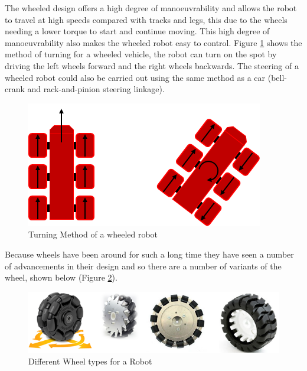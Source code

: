 The wheeled design offers a high degree of manoeuvrability and allows the robot to travel at high speeds compared with tracks and legs, this due to the wheels needing a lower torque to start and continue moving. This high degree of manoeuvrability also makes the wheeled robot easy to control. Figure \ref{fig:wheelturn} shows the method of turning for a wheeled vehicle, the robot can turn on the spot by driving the left wheels forward and the right wheels backwards. The steering of a wheeled robot could also be carried out using the same method as a car (bell-crank and rack-and-pinion steering linkage).\par

\begin{figure}[h]
\centering\includegraphics[width=0.6\linewidth]{Images/DT_Fig_5.png}
\caption{Turning Method of a wheeled robot}
\label{fig:wheelturn}
\end{figure}

Because wheels have been around for such a long time they have seen a number of advancements in their design and so there are a number of variants of the wheel, shown below (Figure \ref{fig:Wheeltype}).\par

\begin{figure}[h]
\centering\includegraphics[width=0.6\linewidth]{Images/DT_Fig_6.png}
\caption{Different Wheel types for a Robot}
\label{fig:Wheeltype}
\end{figure}

